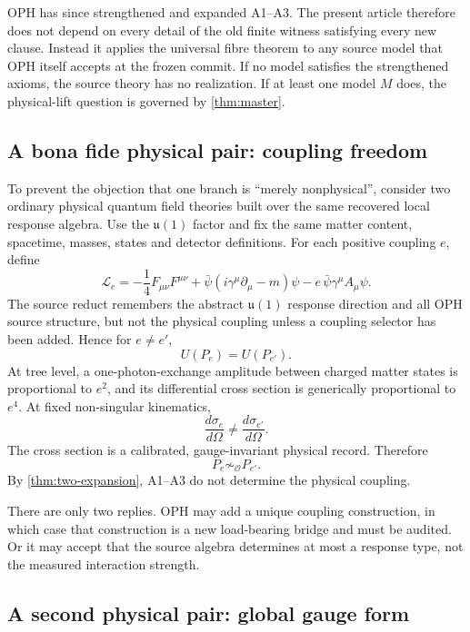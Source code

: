 \documentclass[10pt,a4paper]{article}
\theoremstyle{definition}
\theoremstyle{remark}
\newcommand{\Obs}{\mathcal O}
\newcommand{\obsim}{\sim_{\Obs}}
\begin{document}
OPH has since strengthened and expanded A1--A3.  The present article therefore
does not depend on every detail of the old finite witness satisfying every new
clause.  Instead it applies the universal fibre theorem to any source model
that OPH itself accepts at the frozen commit.  If no model satisfies the
strengthened axioms, the source theory has no realization.  If at least one
model \(M\) does, the physical-lift question is governed by
\cref{thm:master}.

\subsection{A bona fide physical pair: coupling freedom}

To prevent the objection that one branch is ``merely nonphysical'', consider
two ordinary physical quantum field theories built over the same recovered
local response algebra.  Use the \(\mathfrak u(1)\) factor and fix the same
matter content, spacetime, masses, states and detector definitions.  For each
positive coupling \(e\), define
\begin{equation}
\label{eq:qed}
\mathcal L_e
=
-\frac14 F_{\mu\nu}F^{\mu\nu}
+\bar\psi(i\gamma^\mu\partial_\mu-m)\psi
-e\,\bar\psi\gamma^\mu A_\mu\psi.
\end{equation}
The source reduct remembers the abstract \(\mathfrak u(1)\) response direction
and all OPH source structure, but not the physical coupling unless a coupling
selector has been added.  Hence for \(e\neq e'\),
\[
U(P_e)=U(P_{e'}).
\]
At tree level, a one-photon-exchange amplitude between charged matter states is
proportional to \(e^2\), and its differential cross section is generically
proportional to \(e^4\).  At fixed non-singular kinematics,
\[
\frac{d\sigma_e}{d\Omega}\neq
\frac{d\sigma_{e'}}{d\Omega}.
\]
The cross section is a calibrated, gauge-invariant physical record.  Therefore
\[
P_e\not\obsim P_{e'}.
\]
By \cref{thm:two-expansion}, A1--A3 do not determine the physical coupling.

There are only two replies.  OPH may add a unique coupling construction, in
which case that construction is a new load-bearing bridge and must be audited.
Or it may accept that the source algebra determines at most a response type,
not the measured interaction strength.

\subsection{A second physical pair: global gauge form}
\end{document}

